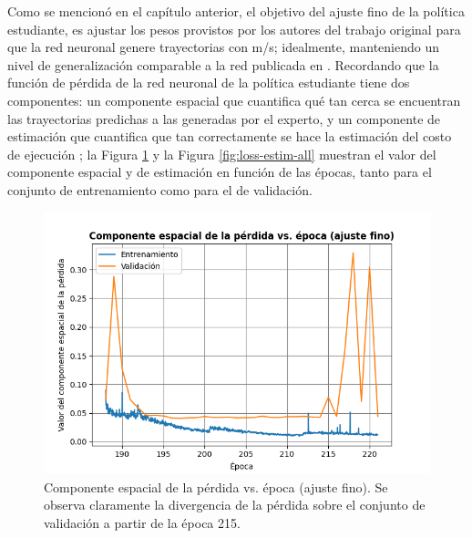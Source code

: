 \label{sec:results-finetune}

Como se mencionó en el capítulo anterior, el objetivo del ajuste fino de la política estudiante, es ajustar los pesos provistos por los autores del trabajo original \cite{Loquercio2021} para que la red neuronal genere trayectorias con  m/s; idealmente, manteniendo un nivel de generalización comparable a la red publicada en \cite{Loquercio2021}. Recordando que la función de pérdida de la red neuronal de la política estudiante tiene dos componentes: un componente espacial que cuantifica qué tan cerca se encuentran las trayectorias predichas a las generadas por el experto, y un componente de estimación que cuantifica que tan correctamente se hace la estimación del costo de ejecución  \cite{Loquercio2021}; la Figura \ref{fig:loss-space-all} y la Figura \ref{fig:loss-estim-all} muestran el valor del componente espacial y de estimación en función de las épocas, tanto para el conjunto de entrenamiento como para el de validación.

\begin{figure}[H]
    \centering
    \includegraphics[scale=0.6]{partes/img/loss-space-all.png}
    \caption[Componente espacial de la pérdida vs. época (ajuste fino).]{Componente espacial de la pérdida vs. época (ajuste fino). Se observa claramente la divergencia de la pérdida sobre el conjunto de validación a partir de la época 215.}
    \label{fig:loss-space-all}
\end{figure}

